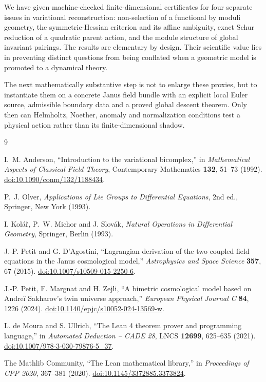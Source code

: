 \documentclass[11pt,a4paper]{article}
\theoremstyle{definition}
\theoremstyle{remark}
\begin{document}
We have given machine-checked finite-dimensional certificates for four
separate issues in variational reconstruction: non-selection of a functional
by moduli geometry, the symmetric-Hessian criterion and its affine ambiguity,
exact Schur reduction of a quadratic parent action, and the module structure
of global invariant pairings. The results are elementary by design. Their
scientific value lies in preventing distinct questions from being conflated
when a geometric model is promoted to a dynamical theory.

The next mathematically substantive step is not to enlarge these proxies, but
to instantiate them on a concrete Janus field bundle with an explicit local
Euler source, admissible boundary data and a proved global descent theorem.
Only then can Helmholtz, Noether, anomaly and normalization conditions test a
physical action rather than its finite-dimensional shadow.

\begin{thebibliography}{9}
\small
\setlength{\itemsep}{0.35em}
\vspace{0.5em}

I.~M. Anderson,
``Introduction to the variational bicomplex,''
in \emph{Mathematical Aspects of Classical Field Theory},
Contemporary Mathematics \textbf{132}, 51--73 (1992).
\href{https://doi.org/10.1090/conm/132/1188434}{doi:10.1090/conm/132/1188434}.

P.~J. Olver,
\emph{Applications of Lie Groups to Differential Equations}, 2nd ed.,
Springer, New York (1993).

I. Kol\'a\v{r}, P.~W. Michor and J. Slov\'ak,
\emph{Natural Operations in Differential Geometry},
Springer, Berlin (1993).

J.-P. Petit and G. D'Agostini,
``Lagrangian derivation of the two coupled field equations in the Janus
cosmological model,''
\emph{Astrophysics and Space Science} \textbf{357}, 67 (2015).
\href{https://doi.org/10.1007/s10509-015-2250-6}{doi:10.1007/s10509-015-2250-6}.

J.-P. Petit, F. Margnat and H. Zejli,
``A bimetric cosmological model based on Andre\"i Sakharov's twin universe
approach,''
\emph{European Physical Journal C} \textbf{84}, 1226 (2024).
\href{https://doi.org/10.1140/epjc/s10052-024-13569-w}{doi:10.1140/epjc/s10052-024-13569-w}.

L. de Moura and S. Ullrich,
``The Lean 4 theorem prover and programming language,''
in \emph{Automated Deduction -- CADE 28}, LNCS \textbf{12699},
625--635 (2021).
\href{https://doi.org/10.1007/978-3-030-79876-5_37}{doi:10.1007/978-3-030-79876-5\_37}.

The Mathlib Community,
``The Lean mathematical library,''
in \emph{Proceedings of CPP 2020}, 367--381 (2020).
\href{https://doi.org/10.1145/3372885.3373824}{doi:10.1145/3372885.3373824}.

\end{thebibliography}
\end{document}
